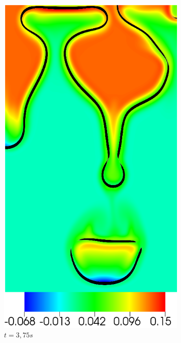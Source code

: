 \begin{figure}[H]
\begin{subfigure}[ht!]{0.2\textwidth}
		\centering
		\includegraphics[width=1\textwidth]{figure/PT_RT/concent0/visit0012.png}
		\caption{$t=3,75s$}
	\end{subfigure}
	\begin{subfigure}[ht!]{0.2\textwidth}
		\centering

\end{subfigure}
\end{figure}
